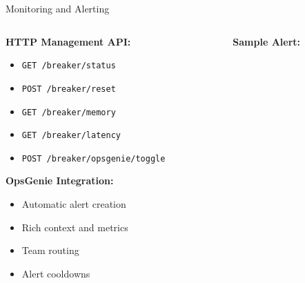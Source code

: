 \documentclass[aspectratio=169]{beamer}
\begin{document}
\begin{frame}{Monitoring and Alerting}
    \begin{columns}
        \begin{column}{0.5\textwidth}
            \textbf{HTTP Management API:}
            \begin{itemize}
                \item \texttt{GET /breaker/status}
                \item \texttt{POST /breaker/reset}
                \item \texttt{GET /breaker/memory}
                \item \texttt{GET /breaker/latency}
                \item \texttt{POST /breaker/opsgenie/toggle}
            \end{itemize}
            
            \vspace{0.3cm}
            \textbf{OpsGenie Integration:}
            \begin{itemize}
                \item Automatic alert creation
                \item Rich context and metrics
                \item Team routing
                \item Alert cooldowns
            \end{itemize}
        \end{column}
        \begin{column}{0.5\textwidth}
            \textbf{Sample Alert:}
            \begin{center}
            \end{center}
            

\end{column}
\end{columns}
\end{frame}
\end{document}
